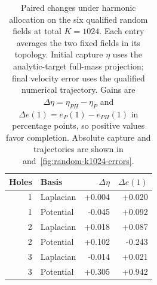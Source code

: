 \begingroup
\begin{table}[!htb]\centering\small
\caption{Paired changes under harmonic allocation on the six qualified random fields at total $K=1024$. Each entry averages the two fixed fields in its topology. Initial capture $\eta$ uses the analytic-target full-mass projection; final velocity error uses the qualified numerical trajectory. Gains are $\Delta\eta=\eta_{PH}-\eta_P$ and $\Delta e(1)=e_P(1)-e_{PH}(1)$ in percentage points, so positive values favor completion. Absolute capture and trajectories are shown in  and~\ref{fig:random-k1024-errors}.}
\label{tab:completion-improvement}
\setlength{\tabcolsep}{4pt}
\begin{tabular}{rlrr}\toprule
Holes & Basis & $\Delta\eta$ & $\Delta e(1)$\\\midrule
1 & Laplacian & +0.004 & +0.020\\
1 & Potential & -0.045 & +0.092\\
2 & Laplacian & +0.018 & +0.087\\
2 & Potential & +0.102 & -0.243\\
3 & Laplacian & -0.014 & +0.021\\
3 & Potential & +0.305 & +0.942\\
\bottomrule\end{tabular}\end{table}
\par\endgroup
